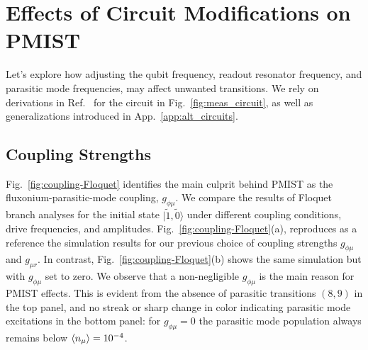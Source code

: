 \documentclass[%
reprint,
superscriptaddress,
 amsmath,amssymb,
 aps,
 prx,
longbibliography,
floatfix,
]{revtex4-2}
\begin{document}
\section{Effects of Circuit Modifications on PMIST}\label{sec:expressions}
Let's explore how adjusting the qubit frequency, readout resonator frequency, and parasitic mode frequencies, may affect unwanted transitions. We rely on derivations in Ref.~\cite{viola2015collective} for the circuit in Fig.~\ref{fig:meas_circuit}, as well as generalizations introduced in App.~\ref{app:alt_circuits}.



\subsection{Coupling Strengths} \label{sec:coupling}

Fig.~\ref{fig:coupling-Floquet} identifies the main culprit behind PMIST as the fluxonium-parasitic-mode coupling, $g_{\phi \mu}$. We compare the results of Floquet branch analyses for the initial state $|\tilde{1}, \tilde{0}\rangle$ under different coupling conditions, drive frequencies, and amplitudes. Fig.~\ref{fig:coupling-Floquet}(a), reproduces as a reference the simulation results for our previous choice of coupling strengths $g_{\phi\mu}$ and $g_{\mu r}$. In contrast, Fig.~\ref{fig:coupling-Floquet}(b) shows the same simulation but with $g_{\phi \mu}$ set to zero. We observe that a non-negligible $g_{\phi\mu}$ is the main reason for PMIST effects. This is evident from the absence of parasitic transitions $(8,9)$ in the top panel, and no streak or sharp change in color indicating parasitic mode excitations in the bottom panel:  for $g_{\phi \mu}=0$ the parasitic mode population always remains below $\braket{n_\mu}=10^{-4}$. 
\end{document}
